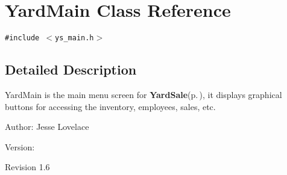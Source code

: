 \section{Yard\-Main Class Reference}
\label{classYardMain}
{\tt \#include $<$ys\_\-main.h$>$}



\subsection{Detailed Description}
Yard\-Main is the main menu screen for {\bf Yard\-Sale}{\rm (p.\,\pageref{classYardSale})}, it displays graphical buttons for accessing the inventory, employees, sales, etc. 

\begin{Desc}
\item[Author:]Jesse Lovelace \end{Desc}
\begin{Desc}
\item[Version:]\begin{Desc}
\item[Revision]1.6 \end{Desc}
\end{Desc}


